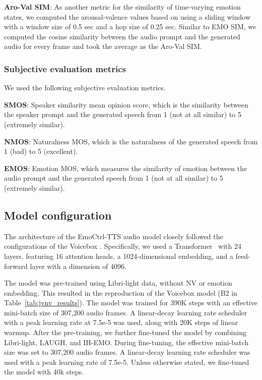 \textbf{Aro-Val SIM}: As another metric for the similarity of time-varying emotion states, we computed the arousal-valence values based on \cite{wagner2023dawn} using a sliding window with a window size of 0.5 sec and a hop size of 0.25 sec. Similar to EMO SIM, we computed the cosine similarity between the audio prompt and the generated audio for every frame and took the average as the Aro-Val SIM.

\vspace{-.5em}
\subsubsection{Subjective evaluation metrics}
\vspace{-.5em}
We used the following subjective evaluation metrics.

\textbf{SMOS}: Speaker similarity mean opinion score, which is the similarity between the speaker prompt and the generated speech from 1 (not at all similar) to 5 (extremely similar).
    
\textbf{NMOS}: Naturalness MOS, which is the naturalness of the generated speech from 1 (bad) to 5 (excellent).
    
\textbf{EMOS}: Emotion MOS, which measures the similarity of emotion between the audio prompt and the generated speech from 1 (not at all similar) to 5 (extremely similar).





\vspace{-.5em}
\subsection{Model configuration}
\vspace{-.5em}

The architecture of the EmoCtrl-TTS audio model closely followed the configurations of the Voicebox \cite{le2024voicebox}. Specifically, we used a Transformer~\cite{vaswani2017attention} with 24 layers, featuring 16 attention heads, a 1024-dimensional embedding, and a feed-forward layer with a dimension of 4096.

The model was pre-trained using Libri-light data, without NV or emotion embedding. This resulted in the reproduction of the Voicebox model (B2 in Table~\ref{tab:jvnv_results}). The model was trained for 390K steps with an effective mini-batch size of 307,200 audio frames.
A linear-decay learning rate scheduler with a peak learning rate at 7.5e-5 was used, along with 20K steps of linear warmup.
After the pre-training, we further fine-tuned the model by combining Libri-light, LAUGH, and IH-EMO.
During fine-tuning, 
the effective mini-batch size was set to 307,200 audio frames. 
A linear-decay learning rate scheduler was used with a peak learning rate of 7.5e-5.
Unless otherwise stated, we fine-tuned the model with 40k steps.


